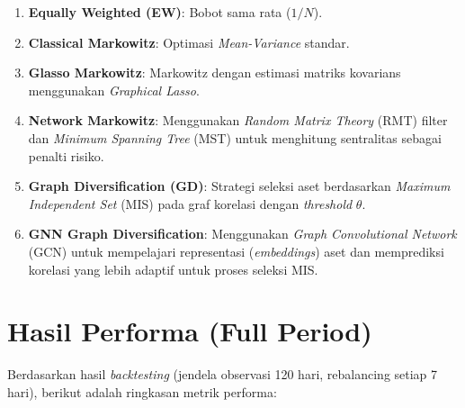 \documentclass[12pt,a4paper]{article}
\begin{document}
\begin{enumerate}
    \item \textbf{Equally Weighted (EW)}: Bobot sama rata ($1/N$).
    \item \textbf{Classical Markowitz}: Optimasi \textit{Mean-Variance} standar.
    \item \textbf{Glasso Markowitz}: Markowitz dengan estimasi matriks kovarians menggunakan \textit{Graphical Lasso}.
    \item \textbf{Network Markowitz}: Menggunakan \textit{Random Matrix Theory} (RMT) filter dan \textit{Minimum Spanning Tree} (MST) untuk menghitung sentralitas sebagai penalti risiko.
    \item \textbf{Graph Diversification (GD)}: Strategi seleksi aset berdasarkan \textit{Maximum Independent Set} (MIS) pada graf korelasi dengan \textit{threshold} $\theta$.
    \item \textbf{GNN Graph Diversification}: Menggunakan \textit{Graph Convolutional Network} (GCN) untuk mempelajari representasi (\textit{embeddings}) aset dan memprediksi korelasi yang lebih adaptif untuk proses seleksi MIS.
\end{enumerate}

\section{Hasil Performa (Full Period)}
Berdasarkan hasil \textit{backtesting} (jendela observasi 120 hari, rebalancing setiap 7 hari), berikut adalah ringkasan metrik performa:

\begin{table}[htbp]
\centering
\caption{Perbandingan Performa Strategi (Periode Penuh)}
\end{table}
\end{document}
